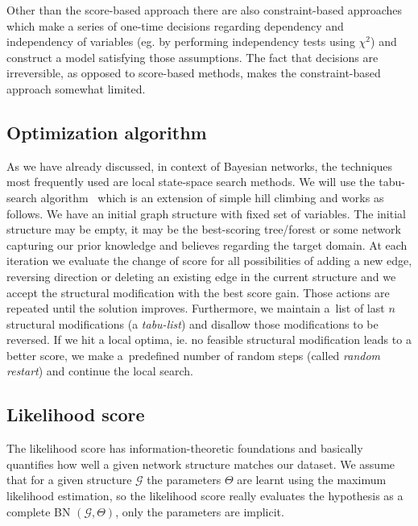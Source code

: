 \documentclass[english,cover]{fitthesis} %
\newcommand{\term}[1]{\emph{#1}}           %
\begin{document}
Other than the score-based approach there are also constraint-based approaches~\cite[p.~786]{pgm} which make a series of one-time decisions regarding dependency and independency of variables (eg. by performing independency tests using $\chi^2$) and construct a model satisfying those assumptions. The fact that decisions are irreversible, as opposed to score-based methods, makes the constraint-based approach somewhat limited.


\subsection{Optimization algorithm}
As we have already discussed, in context of Bayesian networks, the techniques most frequently used are local state-space search methods. We will use the tabu-search algorithm~\cite[p.~816]{pgm} which is an extension of simple hill climbing and works as follows. We have an initial graph structure with fixed set of variables. The initial structure may be empty, it may be the best-scoring tree/forest or some network capturing our prior knowledge and believes regarding the target domain. At each iteration we evaluate the change of score for all possibilities of adding a new edge, reversing direction or deleting an existing edge in the current structure and we accept the structural modification with the best score gain. Those actions are repeated until the solution improves. Furthermore, we maintain a~list of last $n$ structural modifications (a \term{tabu-list}) and disallow those modifications to be reversed. If we hit a local optima, ie. no feasible structural modification leads to a better score, we make a~predefined number of random steps (called \term{random restart}) and continue the local search.



\subsection{Likelihood score}
The likelihood score has information-theoretic foundations and basically quantifies how well a given network structure matches our dataset. We assume that for a given structure $\mathcal{G}$ the parameters $\Theta$ are learnt using the maximum likelihood estimation, so the likelihood score really evaluates the hypothesis as a complete BN $(\mathcal{G}, \Theta)$, only the parameters are implicit.
\end{document}
